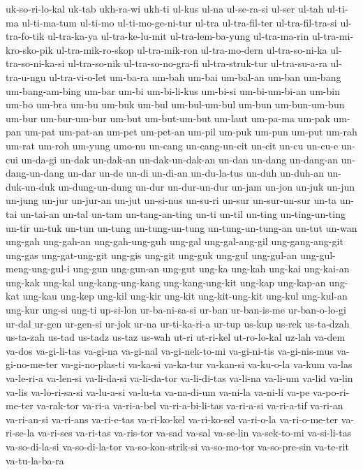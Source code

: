 {uk-so-ri-lo-kal uk-tab ukh-ra-wi ukh-ti ul-kus ul-na ul-se-ra-si ul-ser
ul-tah ul-ti-ma ul-ti-ma-tum ul-ti-mo ul-ti-mo-ge-ni-tur ul-tra
ul-tra-fil-ter ul-tra-fil-tra-si ul-tra-fo-tik ul-tra-ka-ya
ul-tra-ke-lu-mit ul-tra-lem-ba-yung ul-tra-ma-rin ul-tra-mi-kro-sko-pik
ul-tra-mik-ro-skop ul-tra-mik-ron ul-tra-mo-dern ul-tra-so-ni-ka
ul-tra-so-ni-ka-si ul-tra-so-nik ul-tra-so-no-gra-fi ul-tra-struk-tur
ul-tra-su-a-ra ul-tra-u-ngu ul-tra-vi-o-let um-ba-ra um-bah um-bai
um-bal-an um-ban um-bang um-bang-am-bing um-bar um-bi um-bi-li-kus
um-bi-si um-bi-um-bi-an um-bin um-bo um-bra um-bu um-buk um-bul
um-bul-um-bul um-bun um-bun-um-bun um-bur um-bur-um-bur um-but
um-but-um-but um-laut um-pa-ma um-pak um-pan um-pat um-pat-an um-pet
um-pet-an um-pil um-puk um-pun um-put um-rah um-rat um-roh um-yung umo-nu
un-cang un-cang-un-cit un-cit un-cu un-cu-e un-cui un-da-gi un-dak
un-dak-an un-dak-un-dak-an un-dan un-dang un-dang-an un-dang-un-dang
un-dar un-de un-di un-di-an un-du-la-tus un-duh un-duh-an un-duk-un-duk
un-dung-un-dung un-dur un-dur-un-dur un-jam un-jon un-juk un-jun un-jung
un-jur un-jur-an un-jut un-si-nus un-su-ri un-sur un-sur-un-sur un-ta
un-tai un-tai-an un-tal un-tam un-tang-an-ting un-ti un-til un-ting
un-ting-un-ting un-tir un-tuk un-tun un-tung un-tung-un-tung
un-tung-un-tung-an un-tut un-wan ung-gah ung-gah-an ung-gah-ung-guh
ung-gal ung-gal-ang-gil ung-gang-ang-git ung-gas ung-gat-ung-git ung-gis
ung-git ung-guk ung-gul ung-gul-an ung-gul-meng-ung-gul-i ung-gun
ung-gun-an ung-gut ung-ka ung-kah ung-kai ung-kai-an ung-kak ung-kal
ung-kang-ung-kang ung-kang-ung-kit ung-kap ung-kap-an ung-kat ung-kau
ung-kep ung-kil ung-kir ung-kit ung-kit-ung-kit ung-kul ung-kul-an ung-kur
ung-si ung-ti up-si-lon ur-ba-ni-sa-si ur-ban ur-ban-is-me ur-ban-o-lo-gi
ur-dal ur-gen ur-gen-si ur-jok ur-na ur-ti-ka-ri-a ur-tup us-kup us-rek
us-ta-dzah us-ta-zah us-tad us-tadz us-taz us-wah ut-ri ut-ri-kel
ut-ro-lo-kal uz-lah va-dem va-dos va-gi-li-tas va-gi-na va-gi-nal
va-gi-nek-to-mi va-gi-ni-tis va-gi-nis-mus va-gi-no-me-ter
va-gi-no-plas-ti va-ka-si va-ka-tur va-kan-si va-ku-o-la va-kum va-las
va-le-ri-a va-len-si va-li-da-si va-li-da-tor va-li-di-tas va-li-na
va-li-um va-lid va-lin va-lis va-lo-ri-sa-si va-lu-a-si va-lu-ta
va-na-di-um va-ni-la va-ni-li va-pe va-po-ri-me-ter va-rak-tor va-ri-a
va-ri-a-bel va-ri-a-bi-li-tas va-ri-a-si va-ri-a-tif va-ri-an va-ri-an-si
va-ri-ans va-ri-e-tas va-ri-ko-kel va-ri-ko-sel va-ri-o-la va-ri-o-me-ter
va-ri-se-la va-ri-ses va-ri-tas va-ris-tor va-sad va-sal va-se-lin
va-sek-to-mi va-si-li-tas va-so-di-la-si va-so-di-la-tor
va-so-kon-strik-si va-so-mo-tor va-so-pre-sin va-te-rit va-tu-la-ba-ra
}
